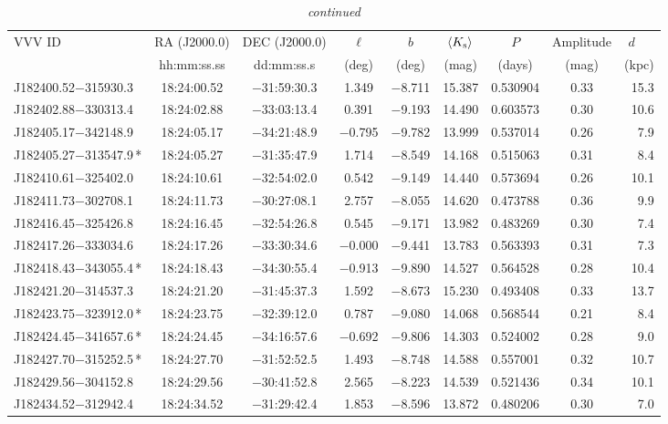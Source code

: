 \begin{table*}
\centering
\caption[]{{\it continued}}
\begin{tabular}{lcccccccr}
\hline \hline
VVV ID & RA (J2000.0)  & DEC (J2000.0) & $\ell$ & $b$ &  $\langle K_{\rm s} \rangle$ & $P$ & Amplitude & $d$~~~ \\
     & hh:mm:ss.ss    & dd:mm:ss.s   &  (deg) & (deg) &   (mag)       & (days) & (mag) & (kpc)   \\
\hline
J182400.52$-$315930.3 & 18:24:00.52 & $-$31:59:30.3 &  1.349 & $-$8.711 & 15.387 & 0.530904 & 0.33 & 15.3 \\
J182402.88$-$330313.4 & 18:24:02.88 & $-$33:03:13.4 &  0.391 & $-$9.193 & 14.490 & 0.603573 & 0.30 & 10.6 \\
J182405.17$-$342148.9 & 18:24:05.17 & $-$34:21:48.9 & $-$0.795 & $-$9.782 & 13.999 & 0.537014 & 0.26 & 7.9 \\
J182405.27$-$313547.9\,* & 18:24:05.27 & $-$31:35:47.9 &  1.714 & $-$8.549 & 14.168 & 0.515063 & 0.31 & 8.4 \\
J182410.61$-$325402.0 & 18:24:10.61 & $-$32:54:02.0 &  0.542 & $-$9.149 & 14.440 & 0.573694 & 0.26 & 10.1 \\
J182411.73$-$302708.1 & 18:24:11.73 & $-$30:27:08.1 &  2.757 & $-$8.055 & 14.620 & 0.473788 & 0.36 & 9.9 \\
J182416.45$-$325426.8 & 18:24:16.45 & $-$32:54:26.8 &  0.545 & $-$9.171 & 13.982 & 0.483269 & 0.30 & 7.4 \\
J182417.26$-$333034.6 & 18:24:17.26 & $-$33:30:34.6 & $-$0.000 & $-$9.441 & 13.783 & 0.563393 & 0.31 & 7.3 \\
J182418.43$-$343055.4\,* & 18:24:18.43 & $-$34:30:55.4 & $-$0.913 & $-$9.890 & 14.527 & 0.564528 & 0.28 & 10.4 \\
J182421.20$-$314537.3 & 18:24:21.20 & $-$31:45:37.3 &  1.592 & $-$8.673 & 15.230 & 0.493408 & 0.33 & 13.7 \\
J182423.75$-$323912.0\,* & 18:24:23.75 & $-$32:39:12.0 &  0.787 & $-$9.080 & 14.068 & 0.568544 & 0.21 & 8.4 \\
J182424.45$-$341657.6\,* & 18:24:24.45 & $-$34:16:57.6 & $-$0.692 & $-$9.806 & 14.303 & 0.524002 & 0.28 & 9.0 \\
J182427.70$-$315252.5\,* & 18:24:27.70 & $-$31:52:52.5 &  1.493 & $-$8.748 & 14.588 & 0.557001 & 0.32 & 10.7 \\
J182429.56$-$304152.8 & 18:24:29.56 & $-$30:41:52.8 &  2.565 & $-$8.223 & 14.539 & 0.521436 & 0.34 & 10.1 \\
J182434.52$-$312942.4 & 18:24:34.52 & $-$31:29:42.4 &  1.853 & $-$8.596 & 13.872 & 0.480206 & 0.30 & 7.0 \\

\end{tabular}
\end{table*}
